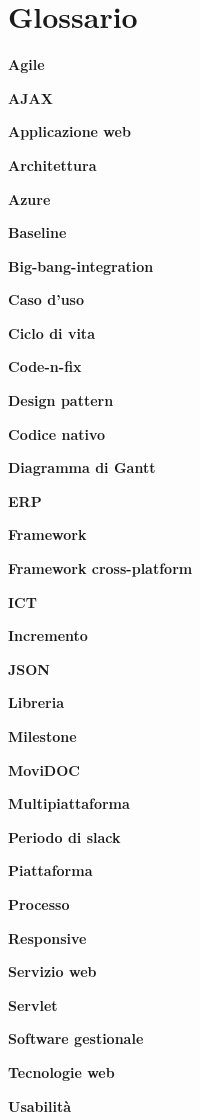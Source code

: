 \chapter{Glossario}

\textbf{Agile}

\textbf{AJAX}

\textbf{Applicazione web}

\textbf{Architettura}

\textbf{Azure}

\textbf{Baseline}

\textbf{Big-bang-integration}

\textbf{Caso d'uso}

\textbf{Ciclo di vita}

\textbf{Code-n-fix}

\textbf{Design pattern}

\textbf{Codice nativo}

\textbf{Diagramma di Gantt}

\textbf{ERP}

\textbf{Framework}

\textbf{Framework cross-platform}

\textbf{ICT}

\textbf{Incremento}

\textbf{JSON}

\textbf{Libreria}

\textbf{Milestone}

\textbf{MoviDOC}

\textbf{Multipiattaforma}

\textbf{Periodo di slack}

\textbf{Piattaforma}

\textbf{Processo}

\textbf{Responsive}

\textbf{Servizio web}

\textbf{Servlet}

\textbf{Software gestionale}

\textbf{Tecnologie web}

\textbf{Usabilità}